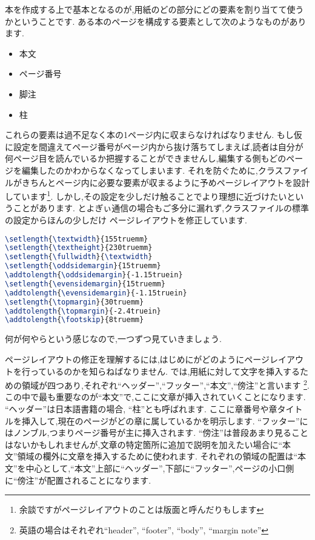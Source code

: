 本を作成する上で基本となるのが,用紙のどの部分にどの要素を割り当てて使うかということです.
ある本のページを構成する要素として次のようなものがあります.
\begin{itemize}
	\item 本文
	\item ページ番号
	\item 脚注
	\item 柱
\end{itemize}
これらの要素は過不足なく本の1ページ内に収まらなければなりません.
もし仮に設定を間違えてページ番号がページ内から抜け落ちてしまえば,読者は自分が何ページ目を読んでいるか把握することができませんし,編集する側もどのページを編集したのかわからなくなってしまいます.
それを防ぐために,クラスファイルがきちんとページ内に必要な要素が収まるように予めページレイアウトを設計しています\footnote{余談ですがページレイアウトのことは版面と呼んだりもします}.
しかし,その設定を少しだけ触ることでより理想に近づけたいということがあります.
とよぎぃ通信の場合もご多分に漏れず,クラスファイルの標準の設定からほんの少しだけ
ページレイアウトを修正しています.
\begin{lstlisting}[caption = ページレイアウトの修正,label = list:layout,language = tex]
\setlength{\textwidth}{155truemm}
\setlength{\textheight}{230truemm}
\setlength{\fullwidth}{\textwidth}
\setlength{\oddsidemargin}{15truemm}
\addtolength{\oddsidemargin}{-1.15truein}
\setlength{\evensidemargin}{15truemm}
\addtolength{\evensidemargin}{-1.15truein}
\setlength{\topmargin}{30truemm}
\addtolength{\topmargin}{-2.4truein}
\addtolength{\footskip}{8truemm}
\end{lstlisting}
何が何やらという感じなので,一つずつ見ていきましょう.

ページレイアウトの修正を理解するには,はじめに{\pLaTeX}がどのようにページレイアウトを行っているのかを知らねばなりません.
{\pLaTeX}では,用紙に対して文字を挿入するための領域が四つあり,それぞれ``ヘッダー'',``フッター'',``本文'',``傍注''と言います
\footnote{英語の場合はそれぞれ``header'', ``footer'', ``body'', ``margin note''}.
この中で最も重要なのが``本文''で,ここに文章が挿入されていくことになります.
``ヘッダー''は日本語書籍の場合, ``柱''とも呼ばれます.
ここに章番号や章タイトルを挿入して,現在のページがどの章に属しているかを明示します.
``フッター''にはノンブル,つまりページ番号が主に挿入されます.
``傍注''は普段あまり見ることはないかもしれませんが,文章の特定箇所に追加で説明を加えたい場合に``本文''領域の欄外に文章を挿入するために使われます.
それぞれの領域の配置は``本文''を中心として,``本文''上部に``ヘッダー'',下部に``フッター'',ページの小口側に``傍注''が配置されることになります.

